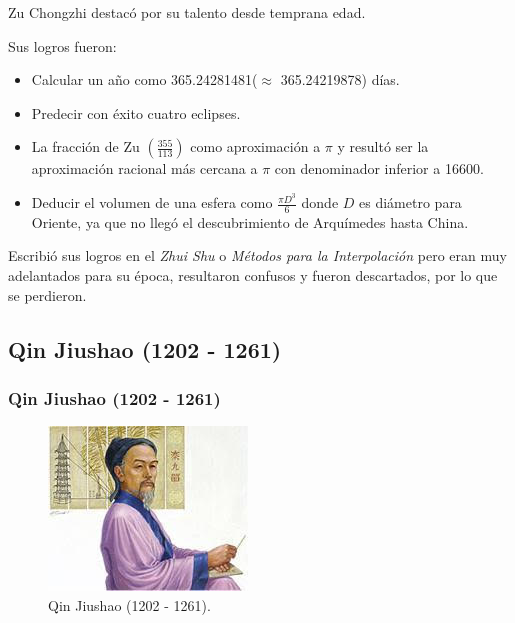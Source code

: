 \documentclass[12pt, aspectratio=169]{beamer} %
\begin{document}
		\begin{frame}
			Zu Chongzhi destacó por su talento desde temprana edad.
			
			Sus logros fueron:
			\pause
			\begin{itemize}
				\item Calcular un año como 365.24281481($\approx$ 365.24219878) días.
				\item Predecir con éxito cuatro eclipses.
				\pause
				\item La fracción de Zu $\displaystyle \left(\frac{355}{113}\right)$ como aproximación a $\pi$ y
				resultó ser la aproximación racional más cercana a $\pi$ con denominador inferior a 16600.
				\pause
				\item Deducir el volumen de una esfera como $\frac{\pi D^3}{6}$ donde $D$ es diámetro para Oriente,
				ya que no llegó el descubrimiento de Arquímedes hasta China.
			\end{itemize}
			
			\pause
			
			Escribió sus logros en el \textit{Zhui Shu} o \textit{Métodos para la Interpolación} pero eran muy
			adelantados para su época, resultaron confusos y fueron descartados, por lo que se perdieron.
		\end{frame}

	\subsection{Qin Jiushao (1202 - 1261)}
		\begin{frame}
			\frametitle{Qin Jiushao (1202 - 1261)}
			\begin{figure}
				\centering
				\includegraphics[width = .4\linewidth]{qin_jiushao.jpg}
				\caption{Qin Jiushao (1202 - 1261).}
			\end{figure}
		\end{frame}			
\end{document}
